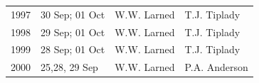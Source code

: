 \documentclass[]{article}
\begin{document}
\begin{longtable}[]{@{}llll@{}}
\begin{minipage}[t]{0.12\columnwidth}
1997\strut
\end{minipage} & \begin{minipage}[t]{0.38\columnwidth}\raggedright\strut
30 Sep; 01 Oct\strut
\end{minipage} & \begin{minipage}[t]{0.18\columnwidth}\raggedright\strut
W.W. Larned\strut
\end{minipage} & \begin{minipage}[t]{0.20\columnwidth}\raggedright\strut
T.J. Tiplady\strut
\end{minipage}\tabularnewline
\begin{minipage}[t]{0.12\columnwidth}\raggedright\strut
1998\strut
\end{minipage} & \begin{minipage}[t]{0.38\columnwidth}\raggedright\strut
29 Sep; 01 Oct\strut
\end{minipage} & \begin{minipage}[t]{0.18\columnwidth}\raggedright\strut
W.W. Larned\strut
\end{minipage} & \begin{minipage}[t]{0.20\columnwidth}\raggedright\strut
T.J. Tiplady\strut
\end{minipage}\tabularnewline
\begin{minipage}[t]{0.12\columnwidth}\raggedright\strut
1999\strut
\end{minipage} & \begin{minipage}[t]{0.38\columnwidth}\raggedright\strut
28 Sep; 01 Oct\strut
\end{minipage} & \begin{minipage}[t]{0.18\columnwidth}\raggedright\strut
W.W. Larned\strut
\end{minipage} & \begin{minipage}[t]{0.20\columnwidth}\raggedright\strut
T.J. Tiplady\strut
\end{minipage}\tabularnewline
\begin{minipage}[t]{0.12\columnwidth}\raggedright\strut
2000\strut
\end{minipage} & \begin{minipage}[t]{0.38\columnwidth}\raggedright\strut
25,28, 29 Sep\strut
\end{minipage} & \begin{minipage}[t]{0.18\columnwidth}\raggedright\strut
W.W. Larned\strut
\end{minipage} & \begin{minipage}[t]{0.20\columnwidth}\raggedright\strut
P.A. Anderson\strut

\end{minipage}
\end{longtable}
\end{document}

